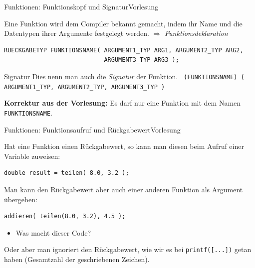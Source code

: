 \documentclass[xcolor=dvipsnames]{beamer}
\newcounter{lecturecounter}
\begin{document}
\begin{frame}[fragile]{Funktionen: Funktionskopf und Signatur}{Vorlesung }
\begin{block}{}
  Eine Funktion wird dem Compiler bekannt gemacht, indem ihr Name und die Datentypen ihrer Argumente festgelegt werden. $\Rightarrow$ \emph{Funktionsdeklaration}
\end{block}

\begin{lstlisting}
RUECKGABETYP FUNKTIONSNAME( ARGUMENT1_TYP ARG1, ARGUMENT2_TYP ARG2,
                            ARGUMENT3_TYP ARG3 );
\end{lstlisting}
\begin{block}{Signatur}
  Dies nenn man auch die \emph{Signatur} der Funktion.
  {\footnotesize \verb| (FUNKTIONSNAME) ( ARGUMENT1_TYP, ARGUMENT2_TYP, ARGUMENT3_TYP ) | }
\end{block}
\textbf{Korrektur aus der Vorlesung:} Es darf nur eine Funktion mit dem Namen \texttt{FUNKTIONSNAME}.
\end{frame}

\begin{frame}[fragile]{Funktionen: Funktionsaufruf und Rückgabewert}{Vorlesung }
\begin{block}{}
Hat eine Funktion einen Rückgabewert, so kann man diesen beim Aufruf einer Variable zuweisen:
\begin{lstlisting}
double result = teilen( 8.0, 3.2 );  
\end{lstlisting}
\end{block}
\begin{block}{}
Man kann den Rückgabewert aber auch einer anderen Funktion als Argument übergeben:
\begin{lstlisting}
addieren( teilen(8.0, 3.2), 4.5 );
\end{lstlisting}
\begin{itemize}
  \item{Was macht dieser Code?} 
\end{itemize}
\end{block}
\begin{block}{}
Oder aber man ignoriert den Rückgabewert, wie wir es bei \texttt{printf([...])} getan haben (Gesamtzahl der geschriebenen Zeichen).
\end{block}
\end{frame}
\end{document}
